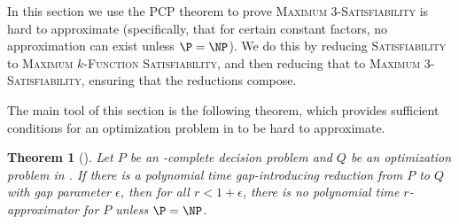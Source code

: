 \documentclass[]{article}
\theoremstyle{plain}
\newtheorem{theorem}{Theorem}
\theoremstyle{definition}
\begin{document}
In this section we use the PCP theorem to prove \textsc{Maximum 3-Satisfiability} is hard to approximate (specifically, that for certain constant factors, no approximation can exist unless $\P = \NP$).
We do this by reducing \textsc{Satisfiability} to \textsc{Maximum $k$-Function Satisfiability}, and then reducing that to \textsc{Maximum 3-Satisfiability}, ensuring that the reductions compose.

The main tool of this section is the following theorem, which provides sufficient conditions for an optimization problem in \NPO{} to be hard to approximate.

\begin{theorem}[{\cite[Theorem~3.7]{book}}]\label{thm:gap}
  Let $P$ be an \NP-complete decision problem and $Q$ be an optimization problem in \NPO.
  If there is a polynomial time gap-introducing reduction from $P$ to $Q$ with gap parameter $\epsilon$, then for all $r < 1 + \epsilon$, there is no polynomial time $r$-approximator for $P$ unless $\P = \NP$.
\end{theorem}
\end{document}
